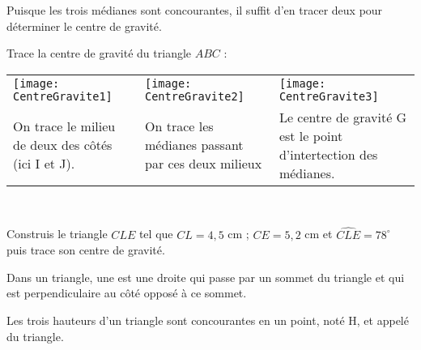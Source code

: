 \vspace{2em}

\begin{methode*1}

\begin{remarque}
Puisque les trois médianes sont concourantes, il suffit d'en tracer deux pour déterminer le centre de gravité.
 \end{remarque}

 \begin{exemple*1}
 Trace la centre de gravité du triangle $ABC$ :
 \begin{tabularx}{\textwidth}{X|X|X}
 \texttt{[image: CentreGravite1]} &  \texttt{[image: CentreGravite2]} & \texttt{[image: CentreGravite3]} \\ 
 On trace le milieu de deux des côtés (ici I et J). & On trace les médianes passant par ces deux milieux & Le centre de gravité G est le point d'intertection des médianes. \\
\end{tabularx} \\

\end{exemple*1}

 
\exercice
Construis le triangle $CLE$ tel que 
$CL = 4,5$ cm ; $CE = 5,2$ cm et $\widehat{CLE} = 78^\circ$ puis trace son centre de gravité.


\end{methode*1}



\newpage

\begin{definition}
Dans un triangle, une  est une droite qui passe par un sommet du triangle et qui est perpendiculaire au côté opposé à ce sommet.

Les trois hauteurs d'un triangle sont concourantes en un point, noté H, et appelé  du triangle.
\end{definition}

\vspace{2em}

